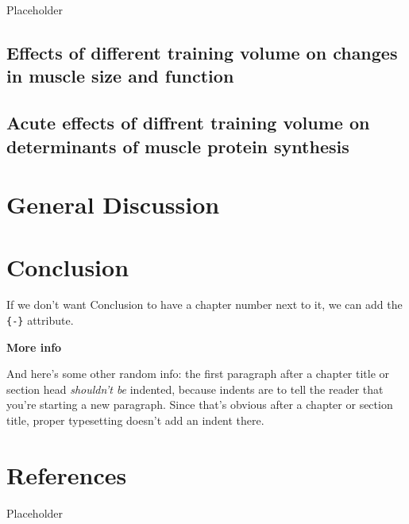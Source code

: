 \documentclass[twoside,10pt]{gihclass} %
\begin{document}
Placeholder

\hypertarget{effects-of-different-training-volume-on-changes-in-muscle-size-and-function}{%
\section{Effects of different training volume on changes in muscle size and function}\label{effects-of-different-training-volume-on-changes-in-muscle-size-and-function}}

\hypertarget{acute-effects-of-diffrent-training-volume-on-determinants-of-muscle-protein-synthesis}{%
\section{Acute effects of diffrent training volume on determinants of muscle protein synthesis}\label{acute-effects-of-diffrent-training-volume-on-determinants-of-muscle-protein-synthesis}}

\hypertarget{general-discussion}{%
\chapter{General Discussion}\label{general-discussion}}

\hypertarget{conclusion}{%
\chapter*{Conclusion}\label{conclusion}}

If we don't want Conclusion to have a chapter number next to it, we can add the \texttt{\{-\}} attribute.

\textbf{More info}

And here's some other random info: the first paragraph after a chapter title or section head \emph{shouldn't be} indented, because indents are to tell the reader that you're starting a new paragraph. Since that's obvious after a chapter or section title, proper typesetting doesn't add an indent there.

\hypertarget{references}{%
\chapter*{References}\label{references}}

Placeholder
\end{document}
